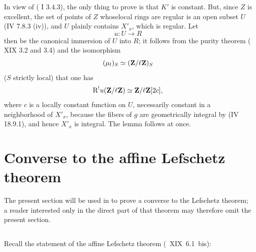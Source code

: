 \enlargethispage{\baselineskip}%
In view of ( I 3.4.3), the only thing to prove is that $K'$ is constant. But, since $Z$ is excellent, the set of points of $Z$ whose\pageoriginale local rings are regular is an open subset $U$ (\EGA IV 7.8.3 \textup{(iv)}), and $U$ plainly contains $X'_x$, which is regular. Let
$$u:U\to R$$
then be the canonical immersion of $U$ into $R$; it follows from the purity theorem ( XIX 3.2 and 3.4) and the isomorphism
$$(\mu_l)_S\simeq(\mathbf Z/\ell\mathbf Z)_S$$
($S$ strictly local) that one has
$$
\mathrm R^!u(\mathbf Z/\ell\mathbf Z)\simeq\mathbf Z/\ell\mathbf Z[2c],
$$
where $c$ is a locally constant function on $U$, necessarily constant in a neighborhood of $X'_x$, because the fibers of $g$ are geometrically integral by (\EGA IV 18.9.1), and hence $X'_x$ is integral. The lemma follows at once.

\section{Converse to the affine Lefschetz theorem} \label{XIV.3}

The present section will be used in \numero {} to prove a converse to the \og Lefschetz theorem\fg; a reader interested only in the direct part of that theorem may therefore omit the present section.

\subsection{} \label{XIV.3.1}

Recall the statement of the affine Lefschetz theorem (~XIX~6.1~bis):

